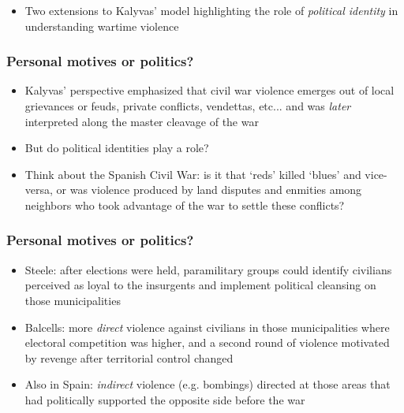 \documentclass[utf8, xcolor=dvipsnames, handout]{beamer}
\begin{document}
\begin{frame}
\vspace{10pt}

\begin{itemize}
  \item Two extensions to Kalyvas' model highlighting the role of \textit{political identity} in understanding wartime violence
\end{itemize}

\end{frame}

\begin{frame}
\frametitle{Personal motives or politics?}
\centering

\begin{itemize}
  \item<1-> Kalyvas' perspective emphasized that civil war violence emerges out of local grievances or feuds, private conflicts, vendettas, etc... and was \textit{later} interpreted along the master cleavage of the war
  \item<2-> But do political identities play a role?
  \item<2-> Think about the Spanish Civil War: is it that `reds' killed `blues' and vice-versa, or was violence produced by land disputes and enmities among neighbors who took advantage of the war to settle these conflicts?
\end{itemize}

\end{frame}


\begin{frame}
\frametitle{Personal motives or politics?}
\centering

\begin{itemize}
  \item Steele: after elections were held, paramilitary groups could identify civilians perceived as loyal to the insurgents and implement political cleansing on those municipalities
  \item Balcells: more \textit{direct} violence against civilians in those municipalities where electoral competition was higher, and a second round of violence motivated by revenge after territorial control changed
  \item Also in Spain: \textit{indirect} violence (e.g. bombings) directed at those areas that had politically supported the opposite side before the war
\end{itemize}

\end{frame}
\end{document}
